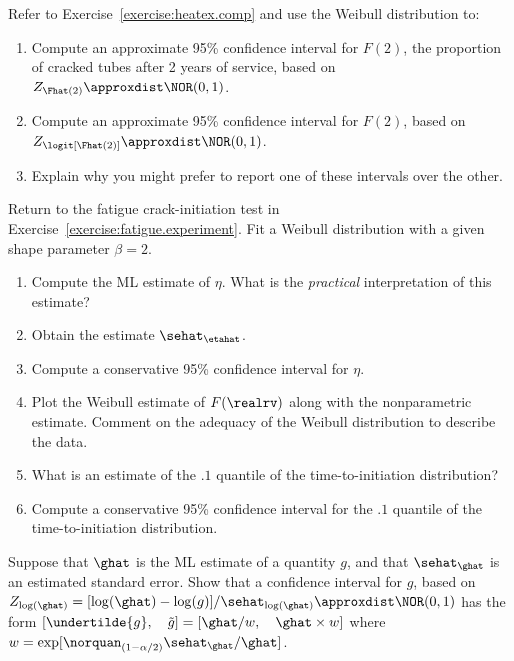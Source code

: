 \begin{exercise}
Refer to Exercise~\ref{exercise:heatex.comp} and use the Weibull distribution to:
     \begin{enumerate}
\item
Compute an approximate 95\% confidence interval 
for $F(2)$, the proportion of cracked tubes
after
2 years of service, based on
$Z_{\Fhat(2)} \approxdist \NOR(0,1)$.
\item
Compute an approximate 95\% confidence interval 
for $F(2)$, 
based on $Z_{\logit[\Fhat(2)]}
\approxdist \NOR(0,1)$.
\item
Explain why you might prefer to report one of these intervals over the other.
\end{enumerate}
\end{exercise}

\begin{exercise}
Return to the fatigue crack-initiation test in
Exercise~\ref{exercise:fatigue.experiment}.
Fit a Weibull distribution
with a given shape parameter $\beta=2$. 
\begin{enumerate}
\item 
Compute the ML estimate of $\eta$. What is the {\em practical}
interpretation of
this estimate?
\item
Obtain the estimate $\sehat_{\etahat}$.
\item
Compute a conservative 95\% confidence interval for $\eta$.
\item
Plot the Weibull estimate of $F(\realrv)$ along with the
nonparametric estimate. Comment on the adequacy of the Weibull distribution to 
describe the data.
\item
What is an estimate of the $.1$ quantile of the time-to-initiation
distribution?
\item
Compute a conservative 95\% confidence interval for the $.1$ quantile of the time-to-initiation
distribution.
\end{enumerate}
\end{exercise}

\begin{exercise}
Suppose that $\ghat$ is the ML estimate of a quantity $g$, and that 
$\sehat_{\ghat}$ is an estimated
standard error. Show that a confidence interval for
$g$, based on 
$Z_{\log(\ghat)}=[\log(\ghat) - \log(g)]/\sehat_{\log(\ghat)} \approxdist
\NOR(0,1)$ has the form
$
[ \undertilde{g}, \quad \tilde{g}]=
[\ghat/w, \quad 
\ghat \times w]
$
where $w=\exp[\norquan_{(1-\alpha/2)} \sehat_{\ghat}  /\ghat]$.
\end{exercise}


